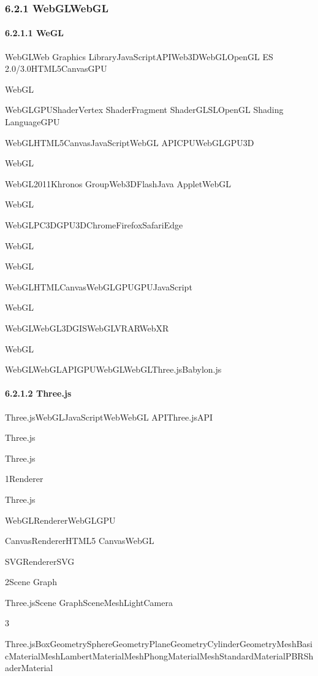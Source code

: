 \hypertarget{webglwebgl}{%
\subsubsection{6.2.1 WebGLWebGL}\label{webglwebgl}}

\hypertarget{wegl}{%
\paragraph{6.2.1.1 WeGL}\label{wegl}}

WebGLWeb Graphics LibraryJavaScriptAPIWeb3DWebGLOpenGL ES
2.0/3.0HTML5CanvasGPU

WebGL

WebGLGPUShaderVertex ShaderFragment ShaderGLSLOpenGL Shading LanguageGPU

WebGLHTML5CanvasJavaScriptWebGL APICPUWebGLGPU3D

WebGL

WebGL2011Khronos GroupWeb3DFlashJava AppletWebGL

WebGL

WebGLPC3DGPU3DChromeFirefoxSafariEdge

WebGL

WebGL

WebGLHTMLCanvasWebGLGPUGPUJavaScript

WebGL

WebGLWebGL3DGISWebGLVRARWebXR

WebGL

WebGLWebGLAPIGPUWebGLWebGLThree.jsBabylon.js

\hypertarget{three.js}{%
\paragraph{6.2.1.2 Three.js}\label{three.js}}

Three.jsWebGLJavaScriptWebWebGL APIThree.jsAPI

Three.js

Three.js

1Renderer

Three.js

WebGLRendererWebGLGPU

CanvasRendererHTML5 CanvasWebGL

SVGRendererSVG

2Scene Graph

Three.jsScene GraphSceneMeshLightCamera

3

Three.jsBoxGeometrySphereGeometryPlaneGeometryCylinderGeometryMeshBasicMaterialMeshLambertMaterialMeshPhongMaterialMeshStandardMaterialPBRShaderMaterial

